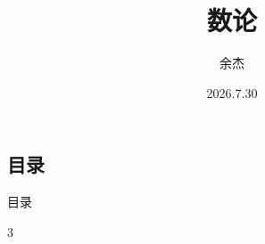 \documentclass [hyperref={bookmarksdepth=4}, aspectratio=169] {beamer}
\theoremstyle {fy}
\begin{document}
\title {数论}
\author {余杰}
\date {2026.7.30}

\frame \titlepage

\subsection*{目录}

\begin{frame}[fragile]{目录}
	\begin{multicols}{3}
		\tableofcontents[subsubsectionstyle=hide]
	\end{multicols}
\end{frame}
















\end{document}
